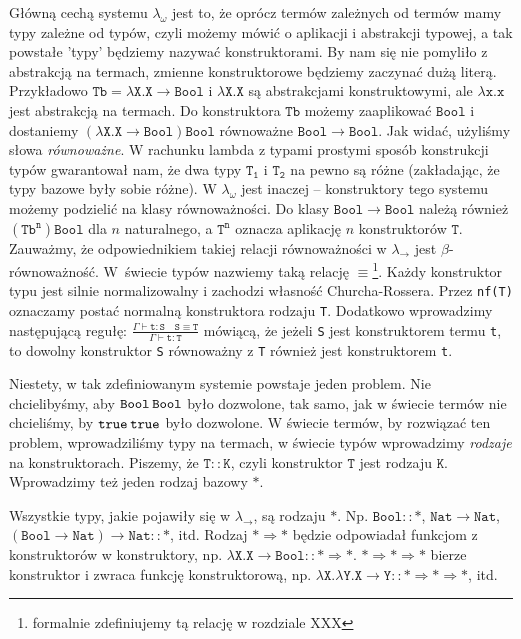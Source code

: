 \documentclass[11pt,leqno]{article}
\begin{document}
Główną cechą systemu $\lambda_{\omega}$ jest to, że oprócz termów zależnych od termów mamy typy zależne od typów, czyli możemy mówić o aplikacji i abstrakcji typowej, a tak powstałe 'typy' będziemy nazywać konstruktorami. By nam się nie pomyliło z abstrakcją na termach, zmienne konstruktorowe będziemy zaczynać dużą literą. Przykładowo $\mathtt{Tb=\lambda X.X \rightarrow Bool}$ i $\mathtt{\lambda X.X}$ są abstrakcjami konstruktowymi, ale $\mathtt{\lambda x.x}$ jest abstrakcją na termach. 
Do konstruktora $\mathtt{Tb}$ możemy zaaplikować $\mathtt{Bool}$ i dostaniemy $\mathtt{(\lambda X.X \rightarrow Bool)Bool}$ równoważne $\mathtt{Bool \rightarrow Bool}$. Jak widać, użyliśmy słowa \textit{równoważne}. W rachunku lambda z typami prostymi sposób konstrukcji typów gwarantował nam, że dwa typy $\mathtt{T_1}$ i $\mathtt{T_2}$ na pewno są różne (zakładając, że typy bazowe były sobie różne). W $\lambda_{\omega}$ jest inaczej -- konstruktory tego systemu możemy podzielić na klasy równoważności. Do klasy $\mathtt{Bool \rightarrow Bool}$ należą również $\mathtt{ (Tb^n) Bool }$ dla $n$ naturalnego, a $\mathtt{T^n}$ oznacza aplikację $n$ konstruktorów $\mathtt{T}$.
Zauważmy, że odpowiednikiem takiej relacji równoważności w $\lambda_{\rightarrow}$  jest $\beta$-równoważność. W~świecie typów nazwiemy taką relację $\equiv$\footnote{formalnie zdefiniujemy tą relację w rozdziale XXX}. Każdy konstruktor typu jest silnie normalizowalny i zachodzi własność Churcha-Rossera. Przez \texttt{nf(T)} oznaczamy postać normalną konstruktora rodzaju \texttt{T}.
Dodatkowo wprowadzimy następującą regułę:
$\mathtt{\frac{\Gamma \vdash t:S \hspace{1em} S\equiv T  }{\Gamma \vdash t:T}}$
mówiącą, że jeżeli \texttt{S} jest konstruktorem termu \texttt{t}, to dowolny konstruktor \texttt{S} równoważny z \texttt{T} również jest konstruktorem \texttt{t}.  

Niestety, w tak zdefiniowanym systemie powstaje jeden problem. Nie chcielibyśmy, aby $\mathtt{Bool \hspace{0.2em} Bool}$ było dozwolone, tak samo, jak w świecie termów nie chcieliśmy, by $\mathtt{true \hspace{0.2em} true}$ było dozwolone. W świecie termów, by rozwiązać ten problem, wprowadziliśmy typy na termach, w świecie typów wprowadzimy \textit{rodzaje} na konstruktorach. Piszemy, że $\mathtt{T::K}$, czyli konstruktor $\mathtt{T}$ jest rodzaju $\mathtt{K}$. Wprowadzimy też jeden rodzaj bazowy $\mathtt{\ast}$.

Wszystkie typy, jakie pojawiły się w $\lambda_{\rightarrow}$, są rodzaju $\mathtt{\ast}$. Np. $\mathtt{Bool :: \ast}$, $\mathtt{Nat \rightarrow Nat}$, $\mathtt{(Bool \rightarrow Nat) \rightarrow Nat} :: \ast$, itd. Rodzaj $\mathtt{\ast \Rightarrow \ast}$ będzie odpowiadał funkcjom z konstruktorów w konstruktory, np. $\mathtt{\lambda X.X \rightarrow Bool::\ast \Rightarrow \ast }$. $\mathtt{\ast \Rightarrow \ast \Rightarrow \ast}$ bierze konstruktor i zwraca funkcję konstruktorową, np. $\mathtt{\lambda X. \lambda Y. X \rightarrow Y::\ast \Rightarrow \ast \Rightarrow \ast}$, itd. 
\end{document}
